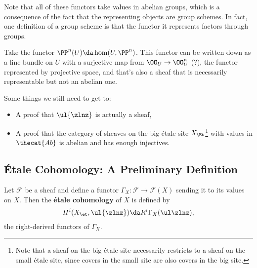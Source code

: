 \begin{remark}

Note that all of these functors take values in abelian groups, which is
a consequence of the fact that the representing objects are group
schemes. In fact, one definition of a group scheme is that the functor
it represents factors through groups.

\end{remark}

\begin{example}[?]

Take the functor \(\PP^n(U) \da \hom(U, \PP^n)\). This functor can be
written down as a line bundle on \(U\) with a surjective map from
\(\OO_U \to \OO_U^n\) (?), the functor represented by projective space,
and that's also a sheaf that is necessarily representable but not an
abelian one.

\end{example}

Some things we still need to get to:

\begin{itemize}
\tightlist
\item
  A proof that \(\ul{\zlnz}\) is actually a sheaf,
\item
  A proof that the category of sheaves on the big étale site
  \(X_\Et\)\footnote{Note that a sheaf on the big étale site necessarily
    restricts to a sheaf on the small étale site, since covers in the
    small site are also covers in the big site.} with values in
  \(\thecat{Ab}\) is abelian and has enough injectives.
\end{itemize}

\hypertarget{uxe9tale-cohomology-a-preliminary-definition}{%
\subsection{Étale Cohomology: A Preliminary
Definition}\label{uxe9tale-cohomology-a-preliminary-definition}}

\begin{definition}

Let \(\mathcal{F}\) be a sheaf and define a functor
\(\Gamma_X: \mathcal{F}\to \mathcal{F}(X)\) sending it to its values on
\(X\). Then the \textbf{étale cohomology} of \(X\) is defined by
\begin{align*}  
H^i(X_\et, \ul{\zlnz}) \da R^i \Gamma_X(\ul \zlnz)
,\end{align*} the right-derived functors of \(\Gamma_X\).

\end{definition}

